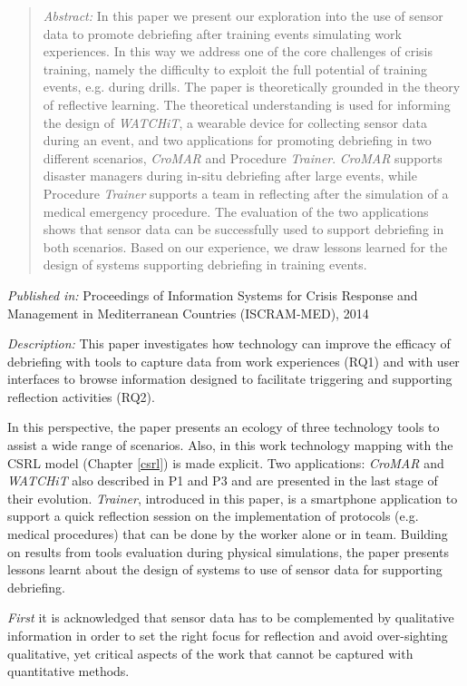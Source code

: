 \begin{quote}
	\emph{Abstract:} In this paper we present our exploration into the use of sensor data to promote debriefing after training events simulating work experiences. In this way we address one of the core challenges of crisis training, namely the difficulty to exploit the full potential of training events, e.g. during drills. The paper is theoretically grounded in the theory of reflective learning. The theoretical understanding is used for informing the design of \emph{WATCHiT}, a wearable device for collecting sensor data during an event, and two applications for promoting debriefing in two different scenarios, \emph{CroMAR} and Procedure \emph{Trainer}. \emph{CroMAR} supports disaster managers during in-situ debriefing after large events, while Procedure \emph{Trainer} supports a team in reflecting after the simulation of a medical emergency procedure. The evaluation of the two applications shows that sensor data can be successfully used to support debriefing in both scenarios. Based on our experience, we draw lessons learned for the design of systems supporting debriefing in training events. 
\end{quote}

\emph{Published in:} Proceedings of Information Systems for Crisis Response and Management in Mediterranean Countries (ISCRAM-MED), 2014

\emph{Description:} This paper investigates how technology can improve the efficacy of debriefing with tools to capture data from work experiences (RQ1) and with user interfaces to browse information designed to facilitate triggering and supporting reflection activities (RQ2).

In this perspective, the paper presents an ecology of three technology tools to assist a wide range of scenarios. Also, in this work technology mapping with the CSRL model (Chapter \ref{csrl}) is made explicit. Two applications: \emph{CroMAR} and \emph{WATCHiT} also described in P1 and P3 and are presented in the last stage of their evolution. \emph{Trainer}, introduced in this paper, is a smartphone application to support a quick reflection session on the implementation of protocols (e.g. medical procedures) that can be done by the worker alone or in team. Building on results from tools evaluation during physical simulations, the paper presents lessons learnt about the design of systems to use of sensor data for supporting debriefing. 

\emph{First} it is acknowledged that sensor data has to be complemented by qualitative information in order to set the right focus for reflection and avoid over-sighting qualitative, yet critical aspects of the work that cannot be captured with quantitative methods.

